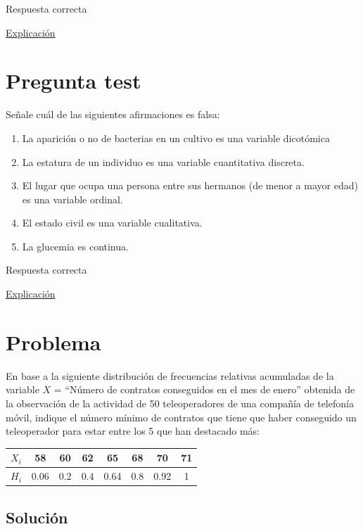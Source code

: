 \documentclass[
]{book}
\providecommand{\tightlist}{%
  \setlength{\itemsep}{0pt}\setlength{\parskip}{0pt}}
\begin{document}
Respuesta correcta

\href{https://1fjmanzano.github.io/bioestadistica/tablas-de-frecuencias.html}{Explicación}

\hypertarget{pregunta-test-2}{%
\section{Pregunta test}\label{pregunta-test-2}}

Señale cuál de las siguientes afirmaciones es falsa:

\begin{enumerate}
\def\labelenumi{\alph{enumi})}
\tightlist
\item
  La aparición o no de bacterias en un cultivo es una variable dicotómica
\item
  La estatura de un individuo es una variable cuantitativa discreta.
\item
  El lugar que ocupa una persona entre sus hermanos (de menor a mayor edad) es una variable ordinal.
\item
  El estado civil es una variable cualitativa.
\item
  La glucemia es continua.
\end{enumerate}

Respuesta correcta

\href{https://1fjmanzano.github.io/bioestadistica/tipos-de-variables.html}{Explicación}

\hypertarget{problema}{%
\section{Problema}\label{problema}}

En base a la siguiente distribución de frecuencias relativas acumuladas de la variable \(X\) = ``Número de contratos conseguidos en el mes de enero'' obtenida de la observación de la actividad de 50 teleoperadores de
una compañía de telefonía móvil, indique el número mínimo de contratos que tiene que haber conseguido un teleoperador para estar entre los 5 que han destacado más:

\begin{longtable}[]{@{}cccccccc@{}}
\toprule
\(X_i\) & 58 & 60 & 62 & 65 & 68 & 70 & 71\tabularnewline
\midrule
\endhead
\(H_i\) & 0.06 & 0.2 & 0.4 & 0.64 & 0.8 & 0.92 & 1\tabularnewline
\bottomrule
\end{longtable}

\hypertarget{soluciuxf3n}{%
\subsection{Solución}\label{soluciuxf3n}}
\end{document}

